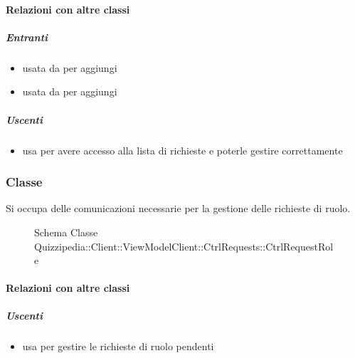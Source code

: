 \paragraph{Relazioni con altre classi}
\subparagraph{Entranti}
\begin{itemize}
\item usata da  per aggiungi
\item usata da  per aggiungi
\end{itemize}
\subparagraph{Uscenti}
\begin{itemize}
\item usa  per avere accesso alla lista di richieste e poterle gestire correttamente
\end{itemize}
\subsubsection{Classe }
Si occupa delle comunicazioni necessarie per la gestione delle richieste di ruolo.
\begin{figure}[H]
\centering
\noindent{}
\caption[Schema Classe CtrlRequestRole]{Schema Classe Quizzipedia::Client::ViewModelClient::CtrlRequests::CtrlRequestRole}
\end{figure}
\paragraph{Relazioni con altre classi}
\subparagraph{Uscenti}
\begin{itemize}
\item usa  per gestire le richieste di ruolo pendenti
\end{itemize}
